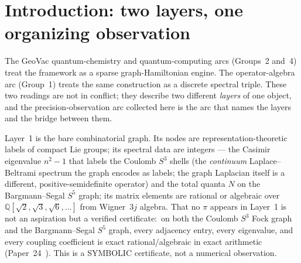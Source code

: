 \documentclass[aps,pra,twocolumn,superscriptaddress,longbibliography,nofootinbib]{revtex4-2}
\begin{document}
\begin{abstract}
their sources.  Two disciplines run throughout.  \emph{First},
every transcendental named here is tagged to its projection---$\pi$ via
the M1 volume slot (unit-sphere and Fock volumes), $\pi^{2k}$ via the spectral action,
$\zeta(2k)$ via even-zeta Dirichlet series, odd~$\zeta$ via the
half-integer-Hurwitz spinor lift, Catalan~$G$ via quarter-integer vertex
parity, $2\pi$ via temporal compactification.  \emph{Second}, the precision comparisons set framework-native values
against measurement, some with residuals the autopsies leave
unexplained; they are \emph{not} first-principles predictions of the constants,
and the multi-focal-composition wall---the framework has no native theorem
for composing multiple Fock-style projections---is named as an active
boundary.  The unifying reading is that compactness forces discreteness
(the converse is false:\ discrete spectrum is the compact-resolvent
property), made operational:\ the discrete skeleton is the compact/closed regime,
and a transcendental is precisely the price of releasing compactness by
integrating over a promoted continuous parameter.
\end{abstract}

\maketitle

\section{Introduction: two layers, one organizing observation}

The GeoVac quantum-chemistry and quantum-computing arcs (Groups~2 and~4)
treat the framework as a sparse graph-Hamiltonian engine.  The
operator-algebra arc (Group~1) treats the same construction as a discrete
spectral triple.  These two readings are not in conflict; they describe
two different \emph{layers} of one object, and the precision-observation
arc collected here is the arc that names the layers and the bridge between
them.

Layer~1 is the bare combinatorial graph.  Its nodes are
representation-theoretic labels of compact Lie groups; its spectral data
are integers --- the Casimir eigenvalue $n^2-1$ that labels the Coulomb
$S^3$ shells (the \emph{continuum} Laplace--Beltrami spectrum the graph
encodes as labels; the graph Laplacian itself is a different,
positive-semidefinite operator) and the total quanta $N$ on the
Bargmann--Segal $S^5$ graph; its matrix elements are rational or
algebraic over $\mathbb{Q}[\sqrt{2},\sqrt{3},\sqrt{6},\ldots]$ from
Wigner~$3j$ algebra.  That no $\pi$ appears in Layer~1 is not an
aspiration but a verified certificate:\ on both the Coulomb $S^3$ Fock
graph and the Bargmann--Segal $S^5$ graph, every adjacency entry, every
eigenvalue, and every coupling coefficient is exact rational/algebraic in
exact arithmetic (Paper~24~\cite{loutey_paper24}).  This is a SYMBOLIC certificate, not a
numerical observation.
\end{document}
